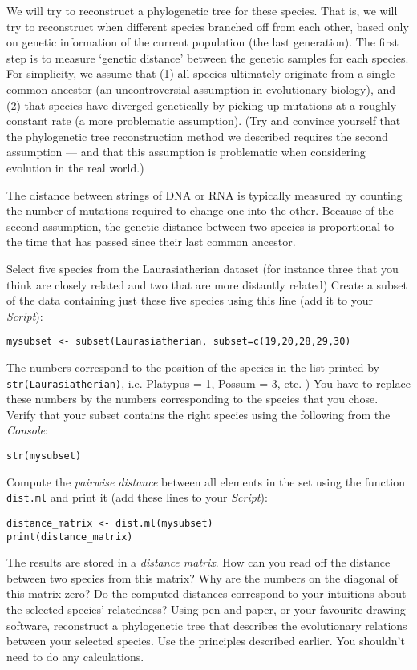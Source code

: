 \documentclass[a4paper, 9pt]{article}
\begin{document}
We will try to reconstruct a phylogenetic tree for these species. That
is, we will try to reconstruct when different species branched off from
each other, based only on genetic information of the current population
(the last generation). The first step is to measure `genetic distance'
between the genetic samples for each species. For simplicity, we assume
that (1) all species ultimately originate from a single common ancestor (an
uncontroversial assumption in evolutionary biology), and (2) that species
have diverged genetically by picking up mutations at a roughly constant
rate (a more problematic assumption). 
(Try and convince yourself that the phylogenetic tree reconstruction method we described requires the second assumption --- and that this assumption is problematic when considering evolution in the real world.)

The distance between strings of DNA or RNA is typically measured by
counting the number of mutations required to change one into the other.
Because of the second assumption, the genetic distance between two
species is proportional to the time that has passed since their last
common ancestor.

\begin{exercise}
    \action Select five species from the Laurasiatherian dataset (for instance three that you think are closely related and two that are more distantly related)
    \action Create a subset of the data containing just these five species using this line (add it to your \emph{Script}):\begin{lstlisting}
mysubset <- subset(Laurasiatherian, subset=c(19,20,28,29,30)
\end{lstlisting}
    The numbers correspond to the position of the species in the list printed by \texttt{str(Laurasiatherian)}, i.e. Platypus = 1, Possum = 3, etc. )
    You have to replace these numbers by the numbers corresponding to the species that you chose. 
    \action Verify that your subset contains the right species using the following from the \emph{Console}:
\begin{lstlisting}
str(mysubset) 
\end{lstlisting}
    \action Compute the \textit{pairwise distance} between all elements in the set using the function \verb|dist.ml| and print it (add these lines to your \emph{Script}):
    \begin{lstlisting}
distance_matrix <- dist.ml(mysubset)
print(distance_matrix)\end{lstlisting}
The results are stored in a \textit{distance matrix}. How can you read off the distance between two species from this matrix? Why are the numbers on the diagonal of this matrix zero?
    \action Do the computed distances correspond to your intuitions about the selected species' relatedness?
    \askstar Using pen and paper, or your favourite drawing software, reconstruct a phylogenetic tree that describes the evolutionary relations between your selected species. Use the principles described earlier. You shouldn't need to do any calculations. 
\end{exercise}
\end{document}
